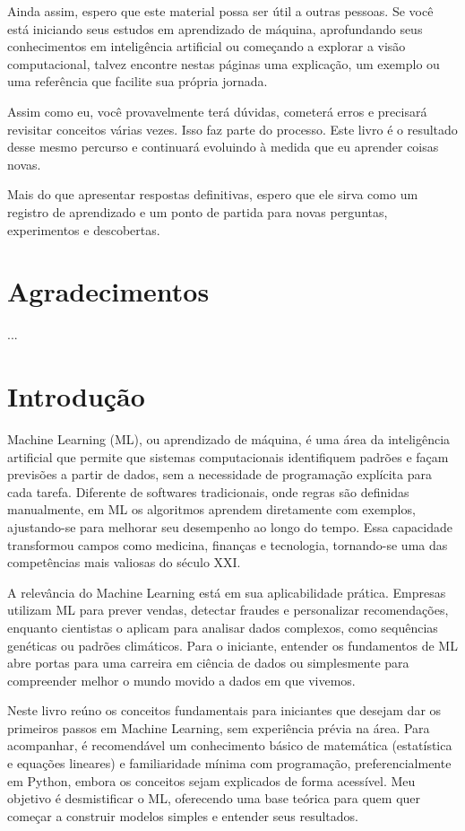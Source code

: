 \documentclass[a4paper,12pt,openany]{book}
\begin{document}
Ainda assim, espero que este material possa ser útil a outras pessoas. Se você está iniciando seus estudos em aprendizado de máquina, aprofundando seus conhecimentos em inteligência artificial ou começando a explorar a visão computacional, talvez encontre nestas páginas uma explicação, um exemplo ou uma referência que facilite sua própria jornada.

Assim como eu, você provavelmente terá dúvidas, cometerá erros e precisará revisitar conceitos várias vezes. Isso faz parte do processo. Este livro é o resultado desse mesmo percurso e continuará evoluindo à medida que eu aprender coisas novas.

Mais do que apresentar respostas definitivas, espero que ele sirva como um registro de aprendizado e um ponto de partida para novas perguntas, experimentos e descobertas.

\chapter*{Agradecimentos}

...

\chapter*{Introdução}
Machine Learning (ML), ou aprendizado de máquina, é uma área da inteligência artificial que permite que sistemas computacionais identifiquem padrões e façam previsões a partir de dados, sem a necessidade de programação explícita para cada tarefa. Diferente de softwares tradicionais, onde regras são definidas manualmente, em ML os algoritmos aprendem diretamente com exemplos, ajustando-se para melhorar seu desempenho ao longo do tempo. Essa capacidade transformou campos como medicina, finanças e tecnologia, tornando-se uma das competências mais valiosas do século XXI.

A relevância do Machine Learning está em sua aplicabilidade prática. Empresas utilizam ML para prever vendas, detectar fraudes e personalizar recomendações, enquanto cientistas o aplicam para analisar dados complexos, como sequências genéticas ou padrões climáticos. Para o iniciante, entender os fundamentos de ML abre portas para uma carreira em ciência de dados ou simplesmente para compreender melhor o mundo movido a dados em que vivemos.

Neste livro reúno os conceitos fundamentais para iniciantes que desejam dar os primeiros passos em Machine Learning, sem experiência prévia na área. Para acompanhar, é recomendável um conhecimento básico de matemática (estatística e equações lineares) e familiaridade mínima com programação, 
preferencialmente em Python, embora os conceitos sejam explicados de forma acessível. Meu objetivo é desmistificar o ML, oferecendo uma base teórica para quem quer começar a construir modelos simples e entender seus resultados.
\end{document}
